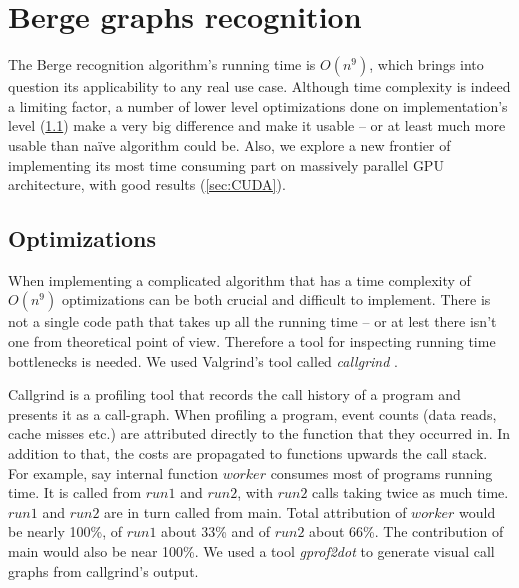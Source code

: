 
\section{Berge graphs recognition}

The Berge recognition algorithm's running time is $O(n^9)$, which brings into question its applicability to any real use case. Although time complexity is indeed a limiting factor, a number of lower level optimizations done on implementation's level (\cref{sec:Optimizations}) make a very big difference and make it usable -- or at least much more usable than na\"ive algorithm could be. Also, we explore a new frontier of implementing its most time consuming part on massively parallel GPU architecture, with good results (\cref{sec:CUDA}).


\subsection{Optimizations}
\label{sec:Optimizations}

When implementing a complicated algorithm that has a time complexity of $O(n^9)$ optimizations can be both crucial and difficult to implement. There is not a single code path that takes up all the running time -- or at lest there isn't one from theoretical point of view. Therefore a tool for inspecting running time bottlenecks is needed. We used Valgrind's tool called \emph{callgrind} \cite{callgrind}.

Callgrind is a profiling tool that records the call history of a program and presents it as a call-graph. When profiling a program, event counts (data reads, cache misses etc.) are attributed directly to the function that they occurred in. In addition to that, the costs are propagated to functions upwards the call stack. For example, say internal function $worker$ consumes most of programs running time. It is called from $run1$ and $run2$, with $run2$ calls taking twice as much time. $run1$ and $run2$ are in turn called from main. Total attribution of $worker$ would be nearly 100\%, of $run1$ about 33\% and of $run2$ about 66\%. The contribution of main would also be near 100\%. We used a tool \emph{gprof2dot} \cite{gprof2dot} to generate visual call graphs from callgrind's output.



